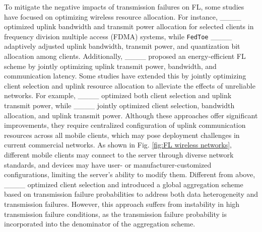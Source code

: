 To mitigate the negative impacts of transmission failures on FL, some studies have focused on optimizing wireless resource allocation.
For instance,
____ optimized uplink bandwidth and transmit power allocation for selected clients in frequency division multiple access (FDMA) systems, while \texttt{FedToe} ____ adaptively adjusted uplink bandwidth, transmit power, and quantization bit allocation among clients.
Additionally, ____ proposed an energy-efficient FL scheme by jointly optimizing uplink transmit power, bandwidth, and communication latency.
Some studies have extended this by jointly optimizing client selection and uplink resource allocation to alleviate the effects of unreliable networks.
For example,
____ optimized both client selection and uplink transmit power,
while ____ jointly optimized client selection, bandwidth allocation, and uplink transmit power.
Although these approaches offer significant improvements, they require centralized configuration of uplink communication resources across all mobile clients, which may pose deployment challenges in current commercial networks.
As shown in Fig. \ref{fig:FL wireless networks}, different mobile clients may connect to the server through diverse network standards, and devices may have user- or manufacturer-customized configurations, limiting the server's ability to modify them.
Different from above, ____ optimized client selection and introduced a global aggregation scheme based on transmission failure probabilities to address both data heterogeneity and transmission failures.
However, this approach suffers from instability in high transmission failure conditions, as the transmission failure probability is incorporated into the denominator of the aggregation scheme.